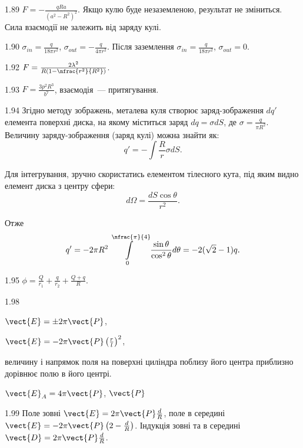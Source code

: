 \begin{Solution}{1.{89}}
	$F = -\frac{qRa}{(a^2 - R^2)^2}$. Якщо кулю буде незаземленою, результат не зміниться. Сила взаємодії не залежить від заряду кулі.
\end{Solution}
\begin{Solution}{1.{90}}
	$\sigma_{in} = \frac{q}{18\pi r^2}$, $\sigma_{out} = - \frac{q}{4\pi r^2}$. Після заземлення $\sigma_{in} = \frac{q}{18\pi r^2}$, $\sigma_{out} = 0$.
\end{Solution}
\begin{Solution}{1.{92}}
	$F = \frac{2\lambda^2}{R\left( 1 - \nfrac{r^2}{R^2}\right) }$.
\end{Solution}
\begin{Solution}{1.{93}}
	$F = \frac{3p^2R^3}{b^7}$, взаємодія~--- притягування.
\end{Solution}
\begin{Solution}{1.{94}}
	Згідно методу зображень, металева куля створює заряд-зображення $dq'$ елемента поверхні диска, на якому міститься заряд $dq = \sigma dS$, де $\sigma = \frac{q}{\pi R^2}$. Величину заряду-зображення (заряд кулі) можна знайти як:
	\[
		q' = - \int\frac{R}{r}\sigma dS.
	\]

	Для інтегрування, зручно скористатись елементом тілесного кута, під яким видно елемент диска з центру сфери:
	\[
		d\Omega = \frac{dS\cos\theta}{r^2}.
	\]

	Отже
	\[
		q' = - 2\pi R^2\int\limits_{0}^{\nfrac{\pi}{4}} \frac{\sin\theta}{\cos^2\theta}d\theta = -2(\sqrt2 - 1)q.
	\]
\end{Solution}
\begin{Solution}{1.{95}}
	$\phi = \frac{Q}{r_1} + \frac{q}{r_2} + \frac{Q+q}{R}$.
\end{Solution}
\begin{Solution}{1.{98}}
		\begin{enumerate*}[label=\alph*)]
			\item $\vect{E} = \pm 2\pi \vect{P}$,
			\item $\vect{E} = -2\pi \vect{P} \left(\frac{r}{l} \right)^2$,
			\item величину і напрямок поля на поверхні циліндра поблизу його центра приблизно дорівнює полю в його центрі.
		\end{enumerate*}
		$\vect{E}_A = 4\pi \vect{P}$, $\vect{P}$
	
\end{Solution}
\begin{Solution}{1.{99}}
		Поле зовні $\vect{E} = 2\pi\vect{P}\frac{d}{R}$, поле в середині $\vect{E} = -2\pi\vect{P}\left( 2 - \frac{d}{R}\right) $.
		Індукція зовні та в середині $\vect{D} = 2\pi\vect{P}\frac{d}{R}$.
	
\end{Solution}
